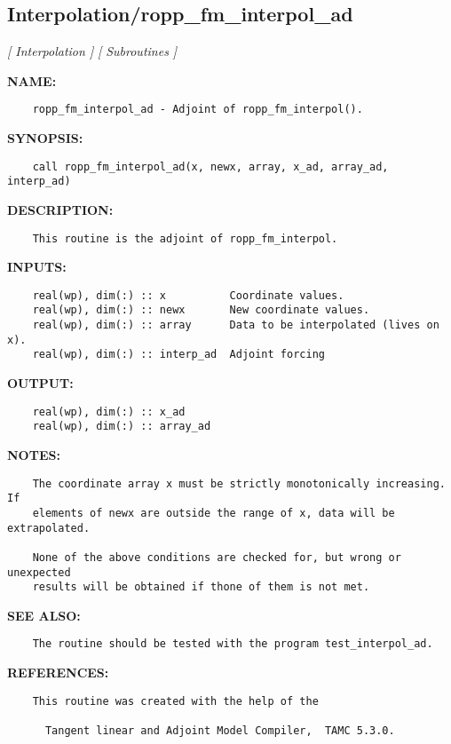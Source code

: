 \subsection{Interpolation/ropp\_fm\_interpol\_ad}
\textsl{[ Interpolation ]}
\textsl{[ Subroutines ]}

\label{ch:robo50}
\label{ch:Interpolation_ropp_fm_interpol_ad}
\textbf{NAME:}\hspace{0.08in}\begin{Verbatim}
    ropp_fm_interpol_ad - Adjoint of ropp_fm_interpol().
\end{Verbatim}
\textbf{SYNOPSIS:}\hspace{0.08in}\begin{Verbatim}
    call ropp_fm_interpol_ad(x, newx, array, x_ad, array_ad, interp_ad)
\end{Verbatim}
\textbf{DESCRIPTION:}\hspace{0.08in}\begin{Verbatim}
    This routine is the adjoint of ropp_fm_interpol.
\end{Verbatim}
\textbf{INPUTS:}\hspace{0.08in}\begin{Verbatim}
    real(wp), dim(:) :: x          Coordinate values.
    real(wp), dim(:) :: newx       New coordinate values.
    real(wp), dim(:) :: array      Data to be interpolated (lives on x).
    real(wp), dim(:) :: interp_ad  Adjoint forcing
\end{Verbatim}
\textbf{OUTPUT:}\hspace{0.08in}\begin{Verbatim}
    real(wp), dim(:) :: x_ad
    real(wp), dim(:) :: array_ad
\end{Verbatim}
\textbf{NOTES:}\hspace{0.08in}\begin{Verbatim}
    The coordinate array x must be strictly monotonically increasing. If
    elements of newx are outside the range of x, data will be extrapolated.

    None of the above conditions are checked for, but wrong or unexpected
    results will be obtained if thone of them is not met. 
\end{Verbatim}
\textbf{SEE ALSO:}\hspace{0.08in}\begin{Verbatim}
    The routine should be tested with the program test_interpol_ad.
\end{Verbatim}
\textbf{REFERENCES:}\hspace{0.08in}\begin{Verbatim}
    This routine was created with the help of the 

      Tangent linear and Adjoint Model Compiler,  TAMC 5.3.0.
\end{Verbatim}
